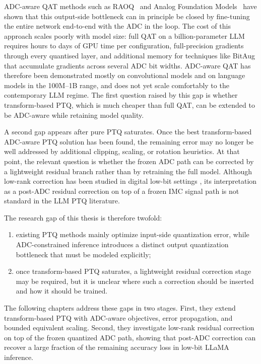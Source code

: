 \documentclass[a4paper,11pt,oneside]{article}
\theoremstyle{breakstyle}
\begin{document}
ADC-aware QAT methods such as RAOQ~\cite{RAOQ2024} and Analog Foundation
Models~\cite{Buechel2025AnalogFoundation} have shown that this output-side
bottleneck can in principle be closed by fine-tuning the entire network
end-to-end with the ADC in the loop. The cost of this approach scales
poorly with model size: full QAT on a billion-parameter LLM requires
hours to days of GPU time per configuration, full-precision gradients
through every quantised layer, and additional memory for techniques like
BitAug that accumulate gradients across several ADC bit widths. ADC-aware
QAT has therefore been demonstrated mostly on convolutional models and on
language models in the 100M--1B range, and does not yet scale comfortably
to the contemporary LLM regime. The first question raised by this gap is
whether transform-based PTQ, which is much cheaper than full QAT, can be
extended to be ADC-aware while retaining model quality.

A second gap appears after pure PTQ saturates. Once the best
transform-based ADC-aware PTQ solution has been found, the remaining
error may no longer be well addressed by additional clipping, scaling,
or rotation heuristics. At that point, the relevant question is whether
the frozen ADC path can be corrected by a lightweight residual branch
rather than by retraining the full model. Although low-rank correction
has been studied in digital low-bit settings
\cite{LQER2024,LowRankCorrection2024,LRQAT2024}, its interpretation as a
post-ADC residual correction on top of a frozen IMC signal path is
not standard in the LLM PTQ literature.

The research gap of this thesis is therefore twofold:
\begin{enumerate}
    \item existing PTQ methods mainly optimize input-side quantization
    error, while ADC-constrained inference introduces a distinct output
    quantization bottleneck that must be modeled explicitly;
    \item once transform-based PTQ saturates, a lightweight residual
    correction stage may be required, but it is unclear where such a
    correction should be inserted and how it should be trained.
\end{enumerate}

The following chapters address these gaps in two stages. First, they
extend transform-based PTQ with ADC-aware objectives, error propagation,
and bounded equivalent scaling. Second, they investigate low-rank
residual correction on top of the frozen quantized ADC path, showing
that post-ADC correction can recover a large fraction of the remaining
accuracy loss in low-bit LLaMA inference.
\end{document}
